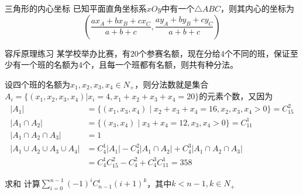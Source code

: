 \begin{solution}
\end{solution}
\begin{example}{三角形的内心坐标}{}
    已知平面直角坐标系$xOy$中有一个$\triangle{ABC}$，则其内心的坐标为\[
    \left(\dfrac{ax_A+bx_B+cx_C}{a+b+c},\dfrac{ay_A+by_B+cy_C}{a+b+c}\right)
    \]
\end{example}
\begin{solution}

\end{solution}
\begin{example}{容斥原理练习}{}
    某学校举办比赛，有$20$个参赛名额，现在分给$4$个不同的班，保证至少有一个班的名额为$4$个，且每一个班都有名额，则共有\underline{\hspace{1cm}}种分法。
\end{example}
\begin{solution}
    设四个班的名额为$x_1,x_2,x_3,x_4\in N_+$，则分法数就是集合$A_i=\{(x_1,x_2,x_3,x_4)|x_i=4,x_1+x_2+x_3+x_4=20\}$的元素个数，又因为
    \begin{align*}|A_{1}|&=\{(x_{1},x_{3},x_{4})\mid x_{2}+x_{3}+x_{4}=16,x_{2},x_{3},x_{4}>0\}=C_{15}^{2}\\|A_{1}\cap A_{2}|&=\{(x_{3},x_{4})\mid x_{3}+x_{4}=12,x_{3},x_{4}>0\}=C_{11}^{1}\\|A_{1}\cap A_{2}\cap A_{3}|&=1\\
    |A_1\cup A_2\cup A_3\cup A_4|&=C_4^1|A_1|-C_4^2|A_1\cap A_2|+C_4^3|A_1\cap A_2\cap A_3|\\
        &=C_4^1C_{15}^2-C_4^2+C_4^3C_{11}^1=358\end{align*}
\end{solution}
\newpage
\begin{example}{求和}{}
    计算$\displaystyle \sum_{i=0}^{n-1}(-1)^{i}C_{n-1}^{i}(i+1)^k$，其中$k<n-1,k\in N_+$
\end{example}
